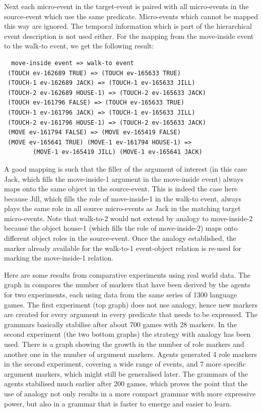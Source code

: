 Next each micro-event in the target-event is paired with all micro-events in the source-event which use the same predicate. Micro-events which cannot be mapped this way are ignored. The temporal information which is part of the hierarchical event description is not used either. For the mapping from the move-inside event to the walk-to event, we get the following result:
\begin{verbatim}
  move-inside event => walk-to event
 (TOUCH ev-162689 TRUE) => (TOUCH ev-165633 TRUE)
 (TOUCH-1 ev-162689 JACK) => (TOUCH-1 ev-165633 JILL)
 (TOUCH-2 ev-162689 HOUSE-1) => (TOUCH-2 ev-165633 JACK)
 (TOUCH ev-161796 FALSE) => (TOUCH ev-165633 TRUE)
 (TOUCH-1 ev-161796 JACK) => (TOUCH-1 ev-165633 JILL)
 (TOUCH-2 ev-161796 HOUSE-1) => (TOUCH-2 ev-165633 JACK)
 (MOVE ev-161794 FALSE) => (MOVE ev-165419 FALSE)
 (MOVE ev-165641 TRUE) (MOVE-1 ev-161794 HOUSE-1) => 
        (MOVE-1 ev-165419 JILL) (MOVE-1 ev-165641 JACK)
\end{verbatim}
A good mapping is such that the filler of the argument of interest (in this case 
Jack, which fills the move-inside-1 argument in the move-inside event) always maps onto the same object in 
the source-event. This is indeed the case here because Jill, which fills the role of move-inside-1 
in the walk-to event, always plays the same role in all source micro-events as Jack in the matching target micro-events. 
Note that walk-to-2 would not extend by analogy to move-inside-2 because the object house-1 (which fills the role 
of move-inside-2) maps onto different object roles in the source-event. 
Once the analogy established, the marker already available for the walk-to-1 event-object relation is 
re-used for marking the move-inside-1 relation. 

Here are some results from comparative experiments using real world data. 
The graph in  compares the number of markers that have been derived by the agents for two experiments, 
each using data from the same series of 1300 language games. The first experiment (top graph) does not 
use analogy, hence new markers are created for every argument in every predicate
that needs to be expressed. The grammars basically stabilise after about 700 games with 28 markers. In the second 
experiment (the two bottom graphs) the strategy with analogy has been used. There is a graph showing the 
growth in the number of role markers and another one in the number of argument markers. Agents 
generated 4 role markers in the second experiment, covering a wide range of events, and 7 more 
specific argument markers, which might still be generalised later. The grammars of the agents stabilised
much earlier after 200 games, which proves the point that the use of analogy not only results in 
a more compact grammar with more expressive power, but also in a grammar that is faster to emerge and 
easier to learn.  

